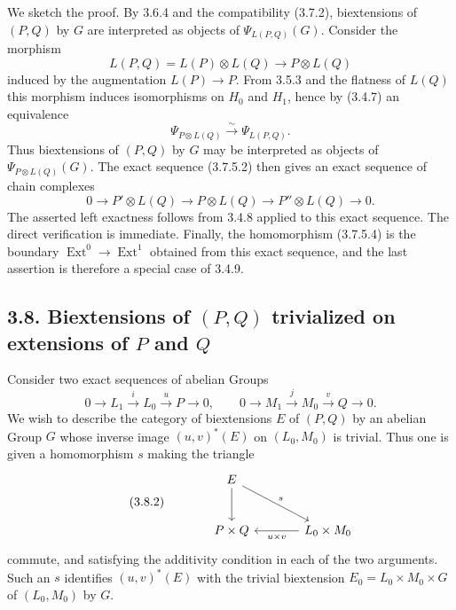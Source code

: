\documentclass[11pt]{article}
\providecommand{\Ext}{\operatorname{Ext}}
\providecommand{\Ext}{\operatorname{Ext}}
\begin{document}
We sketch the proof.  By 3.6.4 and the compatibility (3.7.2), biextensions of \((P,Q)\) by \(G\) are interpreted as objects of \(\Psi_{L(P,Q)}(G)\).  Consider the morphism
\[
        L(P,Q)=L(P)\otimes L(Q)\longrightarrow P\otimes L(Q)
\]
induced by the augmentation \(L(P)\to P\).  From 3.5.3 and the flatness of \(L(Q)\) this morphism induces isomorphisms on \(H_0\) and \(H_1\), hence by (3.4.7) an equivalence
\[
        \Psi_{P\otimes L(Q)}\xrightarrow{\sim}\Psi_{L(P,Q)}.
\]
Thus biextensions of \((P,Q)\) by \(G\) may be interpreted as objects of \(\Psi_{P\otimes L(Q)}(G)\).  The exact sequence (3.7.5.2) then gives an exact sequence of chain complexes
\begin{equation}\tag{3.7.6.1}
        0\longrightarrow P'\otimes L(Q)
        \longrightarrow P\otimes L(Q)
        \longrightarrow P''\otimes L(Q)
        \longrightarrow 0.
\end{equation}
The asserted left exactness follows from 3.4.8 applied to this exact sequence.  The direct verification is immediate.  Finally, the homomorphism (3.7.5.4) is the boundary \(\Ext^0\to\Ext^1\) obtained from this exact sequence, and the last assertion is therefore a special case of 3.4.9.

\subsection*{3.8. Biextensions of \((P,Q)\) trivialized on extensions of \(P\) and \(Q\)}

Consider two exact sequences of abelian Groups
\begin{equation}\tag{3.8.1}
        0\longrightarrow L_1\xrightarrow{i}L_0\xrightarrow{u}P\longrightarrow 0,
        \qquad
        0\longrightarrow M_1\xrightarrow{j}M_0\xrightarrow{v}Q\longrightarrow 0.
\end{equation}
We wish to describe the category of biextensions \(E\) of \((P,Q)\) by an abelian Group \(G\) whose inverse image \((u,v)^*(E)\) on \((L_0,M_0)\) is trivial.  Thus one is given a homomorphism \(s\) making the triangle
\begin{equation}\tag{3.8.2}
\begin{tikzcd}[column sep=large,row sep=large]
& E \arrow[d] \arrow[dr,"s"]&\\
& P\times Q & L_0\times M_0 \arrow[l,"u\times v"]
\end{tikzcd}
\end{equation}
commute, and satisfying the additivity condition in each of the two arguments.  Such an \(s\) identifies \((u,v)^*(E)\) with the trivial biextension \(E_0=L_0\times M_0\times G\) of \((L_0,M_0)\) by \(G\).
\end{document}
